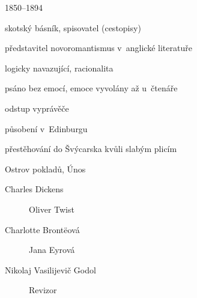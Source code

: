 {\parag{\getauthor}
\begin{compactitem}
	\item 1850--1894
	\item skotský básník, spisovatel (cestopisy)
	\item představitel novoromantismus v~anglické literatuře
		\begin{compactitem}
			\item logicky navazující, racionalita
			\item psáno bez emocí, emoce vyvolány až u~čtenáře
			\item odstup vyprávěče
		\end{compactitem}
	\item působení v~Edinburgu
	\item přestěhování do Švýcarska kvůli slabým plicím
	\item Ostrov pokladů, Únos
\end{compactitem}

\begin{description}
		\item[Charles Dickens] Oliver Twist
		\item[Charlotte Brontëová] Jana Eyrová
		\item[Nikolaj Vasilijevič Godol] Revizor
\end{description}
}
